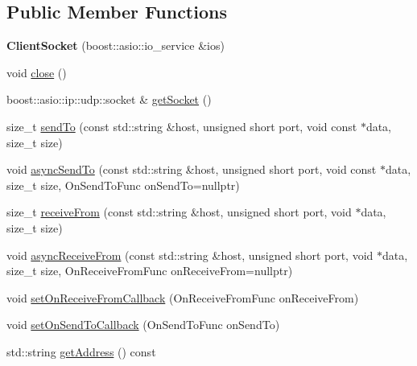\subsection*{Public Member Functions}
\begin{DoxyCompactItemize}
\item 
\mbox{\label{classts_1_1common_1_1udp_1_1_client_socket_a74c773d6063b088437294998da8e7bb3}} 
{\bfseries Client\+Socket} (boost\+::asio\+::io\+\_\+service \&ios)
\item 
void \hyperlink{classts_1_1common_1_1udp_1_1_client_socket_ad58682dc83e4de4814efe73b7c3f8a03}{close} ()
\item 
boost\+::asio\+::ip\+::udp\+::socket \& \hyperlink{classts_1_1common_1_1udp_1_1_client_socket_a6e7a4527ef58ebb10da1dc456d6ef3d2}{get\+Socket} ()
\item 
size\+\_\+t \hyperlink{classts_1_1common_1_1udp_1_1_client_socket_a21b35f111813fe20dcd40f40c12c0f29}{send\+To} (const std\+::string \&host, unsigned short port, void const $\ast$data, size\+\_\+t size)
\item 
void \hyperlink{classts_1_1common_1_1udp_1_1_client_socket_abe684b5395930b9e46cf1bd3cb8a9c32}{async\+Send\+To} (const std\+::string \&host, unsigned short port, void const $\ast$data, size\+\_\+t size, On\+Send\+To\+Func on\+Send\+To=nullptr)
\item 
size\+\_\+t \hyperlink{classts_1_1common_1_1udp_1_1_client_socket_aebfe2f18331fbb67156c0d2ca479a0de}{receive\+From} (const std\+::string \&host, unsigned short port, void $\ast$data, size\+\_\+t size)
\item 
void \hyperlink{classts_1_1common_1_1udp_1_1_client_socket_ae2789434073141d578f5fd740eb42068}{async\+Receive\+From} (const std\+::string \&host, unsigned short port, void $\ast$data, size\+\_\+t size, On\+Receive\+From\+Func on\+Receive\+From=nullptr)
\item 
void \hyperlink{classts_1_1common_1_1udp_1_1_client_socket_a09aac85aca0ed8908e37d2b189ba6fc9}{set\+On\+Receive\+From\+Callback} (On\+Receive\+From\+Func on\+Receive\+From)
\item 
void \hyperlink{classts_1_1common_1_1udp_1_1_client_socket_a04b10fcde4fa312582b02284a5dbdf6c}{set\+On\+Send\+To\+Callback} (On\+Send\+To\+Func on\+Send\+To)
\item 
std\+::string \hyperlink{classts_1_1common_1_1udp_1_1_client_socket_a812b9a0b3cd680dcc37bd708e46a4329}{get\+Address} () const
\end{DoxyCompactItemize}
